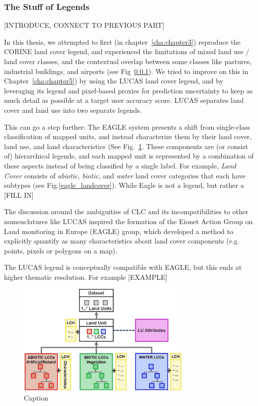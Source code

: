         \subsubsection{The Stuff of Legends}

        [INTRODUCE, CONNECT TO PREVIOUS PART]

        In this thesis, we attempted to first (in chapter\@~\ref{cha:chapter3}) reproduce the CORINE land cover legend, and experienced the limitations of mixed land use / land cover classes, and the contextual overlap between some classes like pastures, industrial buildings, and airports (see Fig\@~\ref{}). We tried to improve on this in Chapter\@~\ref{cha:chapter5}) by using the LUCAS land cover legend, and by leveraging its legend and pixel-based proxies for prediction uncertainty to keep as much detail as possible at a target user accuracy score. LUCAS separates land cover and land use into two separate legends.

        This can go a step further: The EAGLE system presents a shift from single-class classification of mapped units, and instead characterize them by their land cover, land use, and land characteristics (See Fig.\@~\ref{fig:eagle_structure}. These components are (or consist of) hierarchical legends, and each mapped unit is represented by a combination of these aspects instead of being classified by a single label. For example, \textit{Land Cover} consists of \textit{abiotic}, \textit{biotic}, and \textit{water} land cover categories that each have subtypes (see Fig.\@\ref{eagle_landcover}). While Eagle is not a legend, but rather a [FILL IN]

                The discussion around the ambiguities of CLC and its incompatibilities to other nomenclatures like LUCAS inspired the formation of the Eionet Action Group on Land monitoring in Europe (EAGLE) group, which developed a method to explicitly quantify as many characteristics about land cover components (e.g. points, pixels or polygons on a map). 
        
        The LUCAS legend is conceptually compatible with EAGLE, but this ends at higher thematic resolution. For example [EXAMPLE]

        \begin{figure}[H]
            \centering
            \includegraphics[width=0.75\textwidth]{figs_01/eagle_structure.png}
            \caption{Caption}
            \label{fig:eagle_structure}
        \end{figure}



